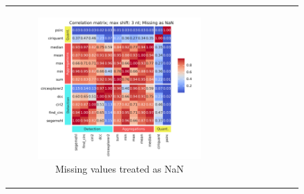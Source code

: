 \begin{figure}[ht]
    \begin{tabular}{cc}
        \begin{subfigure}{0.5\textwidth}
            \centering

            \includegraphics[width=\linewidth]{chapters/4_results_and_discussion/figures/quantification/correlation_heatmap_3_na.png}
            \caption{Missing values treated as NaN}
            \label{fig:correlation_heatmap_3_na}
        \end{subfigure}
         &
        \begin{subfigure}{0.5\textwidth}
            \centering


\end{subfigure}
\end{tabular}
\end{figure}
